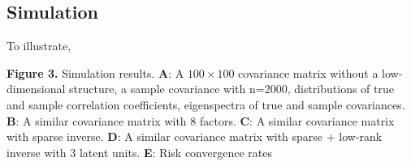 \subsection{Simulation}
To illustrate,

\textbf{Figure 3.}{
Simulation results. 
\textbf{A}: A $100 \times 100$ covariance matrix without a low-dimensional structure, a sample covariance with n=2000, distributions of true and sample correlation coefficients, eigenspectra of true and sample covariances.
\textbf{B}: A similar covariance matrix with 8 factors.
\textbf{C}: A similar covariance matrix with sparse inverse. 
\textbf{D}: A similar covariance matrix with sparse + low-rank inverse with 3 latent units.
\textbf{E}: Risk convergence rates
}\label{fig:03}
